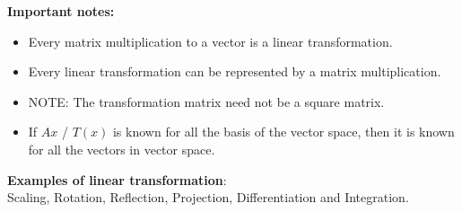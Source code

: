 \textbf{Important notes:}
\begin{itemize}
\item Every matrix multiplication to a vector is a linear transformation.
\item Every linear transformation can be represented by a matrix multiplication.
\item NOTE: The transformation matrix need not be a square matrix.
\item If $Ax$ / $T(x)$ is known for all the basis of the vector space, then it is known for all the vectors in vector space.
\end{itemize}

\textbf{Examples of linear transformation}:\\
Scaling, Rotation, Reflection, Projection, Differentiation and Integration.\\

